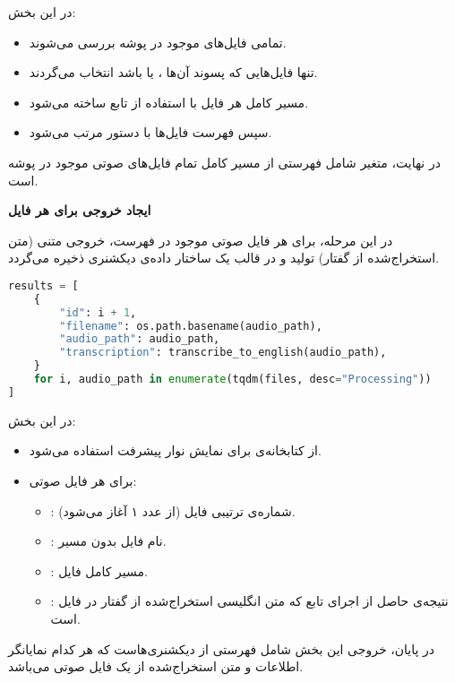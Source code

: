 \documentclass{article}
\begin{document}
در این بخش:
\begin{itemize}
    \item تمامی فایل‌های موجود در پوشه بررسی می‌شوند.
    \item تنها فایل‌هایی که پسوند آن‌ها ،  یا  باشد انتخاب می‌گردند.
    \item مسیر کامل هر فایل با استفاده از تابع  ساخته می‌شود.
    \item سپس فهرست فایل‌ها با دستور  مرتب می‌شود.
\end{itemize}

در نهایت، متغیر  شامل فهرستی از مسیر کامل تمام فایل‌های صوتی موجود در پوشه است.

\textbf{ایجاد خروجی برای هر فایل}

در این مرحله، برای هر فایل صوتی موجود در فهرست، خروجی متنی (متن استخراج‌شده از گفتار) تولید و در قالب یک ساختار داده‌ی دیکشنری ذخیره می‌گردد.

\begin{latin}
\begin{lstlisting}[language=Python]
results = [
    {
        "id": i + 1,
        "filename": os.path.basename(audio_path),
        "audio_path": audio_path,
        "transcription": transcribe_to_english(audio_path),
    }
    for i, audio_path in enumerate(tqdm(files, desc="Processing"))
]
\end{lstlisting}
\end{latin}

در این بخش:
\begin{itemize}
    \item از کتابخانه‌ی  برای نمایش نوار پیشرفت استفاده می‌شود.
    \item برای هر فایل صوتی:
    \begin{itemize}
        \item {}: شماره‌ی ترتیبی فایل (از عدد ۱ آغاز می‌شود).
        \item {}: نام فایل بدون مسیر.
        \item {}: مسیر کامل فایل.
        \item {}: نتیجه‌ی حاصل از اجرای تابع  که متن انگلیسی استخراج‌شده از گفتار در فایل است.
    \end{itemize}
\end{itemize}

در پایان، خروجی این بخش شامل فهرستی از دیکشنری‌هاست که هر کدام نمایانگر اطلاعات و متن استخراج‌شده از یک فایل صوتی می‌باشد.
\end{document}
